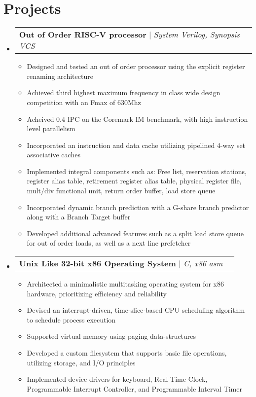 \documentclass[letterpaper,10pt]{article}
\makeatletter
\newcommand{\resumeItem}[1]{
  \item\small{
    {#1 \vspace{-2pt}}
  }
}
\newcommand{\resumeProjectHeading}[2]{
    \item
    \begin{tabular*}{0.97\textwidth}{l@{\extracolsep{\fill}}r}
      \small#1 & #2 \\
    \end{tabular*}\vspace{-7pt}
}
\newcommand{\resumeSubHeadingListStart}{\begin{itemize}[leftmargin=0.15in, label={}, itemsep=0pt]}
\newcommand{\resumeItemListStart}{\begin{itemize}}
\newcommand{\resumeItemListEnd}{\end{itemize}\vspace{-5pt}}
\makeatother
\begin{document}
\section{Projects}
\resumeSubHeadingListStart
\resumeProjectHeading
{\textbf{Out of Order RISC-V processor} $|$ \emph{System Verilog, Synopsis VCS}}{}
\resumeItemListStart
\resumeItem{Designed and tested an out of order processor using the explicit register renaming architecture}
\resumeItem{Achieved third highest maximum frequency in class wide design competition with an Fmax of 630Mhz}
\resumeItem{Acheived 0.4 IPC on the Coremark IM benchmark, with high instruction level parallelism}
\resumeItem{Incorporated an instruction and data cache utilizing pipelined 4-way set associative caches}
\resumeItem{Implemented integral components such as: Free list, reservation stations, register alias table, retirement register alias table, physical register file, mult/div functional unit, return order buffer, load store queue}
\resumeItem{Incorporated dynamic branch prediction with a G-share branch predictor along with a Branch Target buffer}
\resumeItem{Developed additional advanced features such as a split load store queue for out of order loads, as well as a next line prefetcher}
\resumeItemListEnd
\resumeProjectHeading
{\textbf{Unix Like 32-bit x86 Operating System} $|$ \emph{C, x86 asm}}{}
\resumeItemListStart
\resumeItem{Architected a minimalistic multitasking operating system for x86 hardware, prioritizing efficiency and reliability}
\resumeItem{Devised an interrupt-driven, time-slice-based CPU scheduling algorithm to schedule process execution}
\resumeItem{Supported virtual memory using paging data-structures}
\resumeItem{Developed a custom filesystem that supports basic file operations, utilizing storage, and I/O principles}
\resumeItem{Implemented device drivers for keyboard, Real Time Clock, Programmable Interrupt Controller, and Programmable Interval Timer}
\resumeItemListEnd
\resumeItemListEnd
\end{document}
